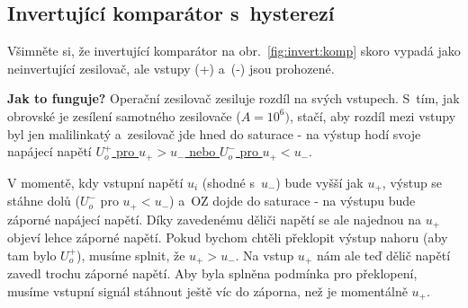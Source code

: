 \documentclass[a4paper,12pt]{article}   %
\begin{document}
\subsection*{Invertující komparátor s~hysterezí}
Všimněte si, že invertující komparátor na obr.~\ref{fig:invert:komp} skoro vypadá jako neinvertující zesilovač, ale vstupy (+) a~(-) jsou prohozené.

\textbf{Jak to funguje?} Operační zesilovač zesiluje rozdíl na svých vstupech. S~tím, jak obrovské je zesílení samotného zesilovače ($A = 10^6)$, stačí, aby rozdíl mezi vstupy byl jen malilinkatý a~zesilovač jde hned do saturace - na výstup hodí svoje napájecí napětí \underline{$U_o^+$ pro $u_+ > u_-$ nebo $U_o^-$ pro $u_+ < u_-$}.

V momentě, kdy vstupní napětí $u_i$ (shodné s~$u_-$) bude vyšší jak $u_+$, výstup se stáhne dolů ($U_o^-$ pro $u_+ < u_-$) a~OZ dojde do saturace - na výstupu bude záporné napájecí napětí. Díky zavedenému děliči napětí se ale najednou na $u_+$ objeví lehce záporné napětí. Pokud bychom chtěli překlopit výstup nahoru (aby tam bylo $U_o^+$), musíme splnit, že $u_+ > u_-$. Na vstup $u_+$ nám ale teď dělič napětí zavedl trochu záporné napětí. Aby byla splněna podmínka pro překlopení, musíme vstupní signál stáhnout ještě víc do záporna, než je momentálně $u_+$.
\end{document}
